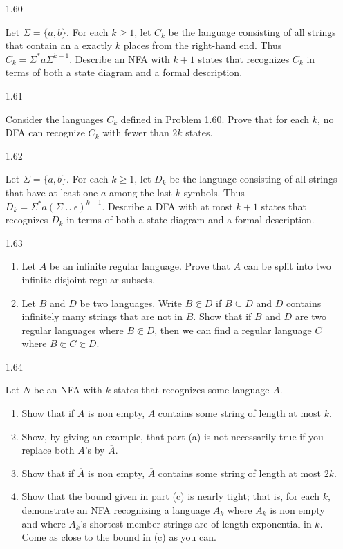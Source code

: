 \begin{enumerate}

      \item [1.60]


            Let $\Sigma =\{a,b\}$. For each $k \ge 1$, let $C_k$ be the language consisting of all strings that contain an a exactly $k$ places from the right-hand end. Thus $C_k = \Sigma^\ast a \Sigma^{k-1}$. Describe an NFA with $k+1$ states that recognizes $C_k$ in terms of both a state diagram and a formal description.

      \item [1.61]

            Consider the languages $C_k$ defined in Problem 1.60. Prove that for each $k$, no DFA can recognize $C_k$ with fewer than $2k$ states.

      \item [1.62]

            Let $\Sigma =\{a,b\}$. For each $k \ge 1$, let $D_k$ be the language consisting of all strings that have at least one $a$ among the last $k$ symbols. Thus $D_k = \Sigma^\ast a(\Sigma \cup \epsilon)^{k-1}$. Describe a DFA with at most $k+1$ states that recognizes $D_k$ in terms of both a state diagram and a formal description.

      \item [1.63]

            \begin{enumerate}
                  \item Let $A$ be an infinite regular language. Prove that $A$ can be split into two infinite disjoint regular subsets.
                  \item Let $B$ and $D$ be two languages. Write $B \Subset D$ if $B \subseteq D$ and $D$ contains infinitely many strings that are not in $B$. Show that if $B$ and $D$ are two regular languages where $B \Subset D$, then we can find a regular language $C$ where $B \Subset C \Subset D$.
            \end{enumerate}

      \item [1.64]

            Let $N$ be an NFA with $k$ states that recognizes some language $A$.
            \begin{enumerate}
                  \item Show that if $A$ is non empty, $A$ contains some string of length at most $k$.
                  \item Show, by giving an example, that part (a) is not necessarily true if you replace both $A$’s by $\overline{A}$.
                  \item Show that if $\overline{A}$ is non empty, $\overline{A}$ contains some string of length at most $2k$.
                  \item Show that the bound given in part (c) is nearly tight; that is, for each $k$, demonstrate an NFA recognizing a language $\overline{A_k}$ where $\overline{A_k}$ is non empty and where $\overline{A_k}$’s shortest member strings are of length exponential in $k$. Come as close to the bound in (c) as you can.
            \end{enumerate}


\end{enumerate}
